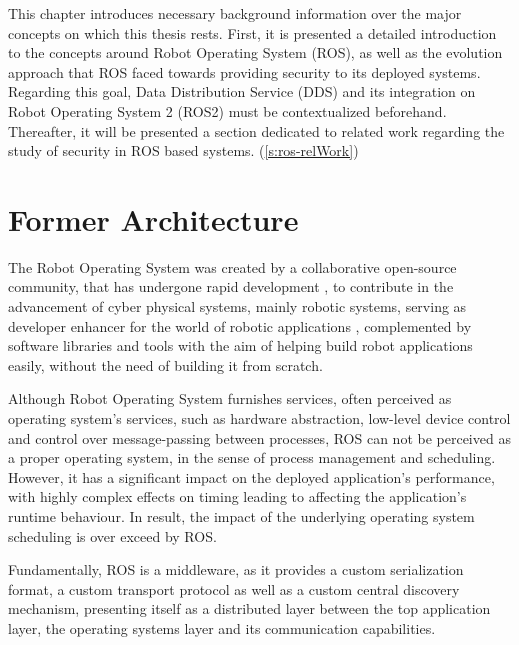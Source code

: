 This chapter introduces necessary background information over the major concepts on which this thesis rests. First, it is presented a detailed introduction to the concepts around Robot Operating System (ROS), as well as the evolution approach that ROS faced towards providing security to its deployed systems. Regarding this goal, Data Distribution Service (DDS) and its integration on Robot Operating System 2 (ROS2) must be contextualized beforehand. Thereafter, it will be presented a section dedicated to related work regarding the study of security in ROS based systems. (\ref{s:ros-relWork})


\section{Former Architecture}

The Robot Operating System was created by a collaborative open-source community, that has undergone rapid development \cite{cousins2011exponential}, to contribute in the advancement of cyber physical systems, mainly robotic systems, serving as developer enhancer for the world of robotic applications \cite{diluoffo2018robot}, complemented by software libraries and tools with the aim of helping build robot applications easily, without the need of building it from scratch.

Although Robot Operating System furnishes services, often perceived as operating system's services, such as hardware abstraction, low-level device control and control over message-passing between processes, ROS can not be perceived as a proper operating system, in the sense of process management and scheduling. However, it has a significant impact on the deployed application's performance, with highly complex effects on timing leading to affecting the application's runtime behaviour. In result, the impact of the underlying operating system scheduling is over exceed by ROS. \cite{intro-ros, casini2019response} 

Fundamentally, ROS is a middleware, as it provides a custom serialization format, a custom transport protocol as well as a custom central discovery mechanism, presenting itself as a distributed layer between the top application layer, the operating systems layer and its communication capabilities. 

